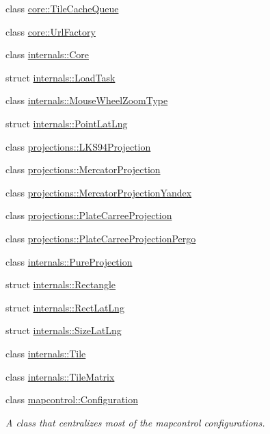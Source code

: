\begin{DoxyCompactItemize}
\item 
class \hyperlink{classcore_1_1_tile_cache_queue}{core\-::\-Tile\-Cache\-Queue}
\item 
class \hyperlink{classcore_1_1_url_factory}{core\-::\-Url\-Factory}
\item 
class \hyperlink{classinternals_1_1_core}{internals\-::\-Core}
\item 
struct \hyperlink{structinternals_1_1_load_task}{internals\-::\-Load\-Task}
\item 
class \hyperlink{classinternals_1_1_mouse_wheel_zoom_type}{internals\-::\-Mouse\-Wheel\-Zoom\-Type}
\item 
struct \hyperlink{structinternals_1_1_point_lat_lng}{internals\-::\-Point\-Lat\-Lng}
\item 
class \hyperlink{classprojections_1_1_l_k_s94_projection}{projections\-::\-L\-K\-S94\-Projection}
\item 
class \hyperlink{classprojections_1_1_mercator_projection}{projections\-::\-Mercator\-Projection}
\item 
class \hyperlink{classprojections_1_1_mercator_projection_yandex}{projections\-::\-Mercator\-Projection\-Yandex}
\item 
class \hyperlink{classprojections_1_1_plate_carree_projection}{projections\-::\-Plate\-Carree\-Projection}
\item 
class \hyperlink{classprojections_1_1_plate_carree_projection_pergo}{projections\-::\-Plate\-Carree\-Projection\-Pergo}
\item 
class \hyperlink{classinternals_1_1_pure_projection}{internals\-::\-Pure\-Projection}
\item 
struct \hyperlink{structinternals_1_1_rectangle}{internals\-::\-Rectangle}
\item 
struct \hyperlink{structinternals_1_1_rect_lat_lng}{internals\-::\-Rect\-Lat\-Lng}
\item 
struct \hyperlink{structinternals_1_1_size_lat_lng}{internals\-::\-Size\-Lat\-Lng}
\item 
class \hyperlink{classinternals_1_1_tile}{internals\-::\-Tile}
\item 
class \hyperlink{classinternals_1_1_tile_matrix}{internals\-::\-Tile\-Matrix}
\item 
class \hyperlink{classmapcontrol_1_1_configuration}{mapcontrol\-::\-Configuration}
\begin{DoxyCompactList}\small\item\em \-A class that centralizes most of the mapcontrol configurations. \end{DoxyCompactList}\item 

\end{DoxyCompactItemize}

